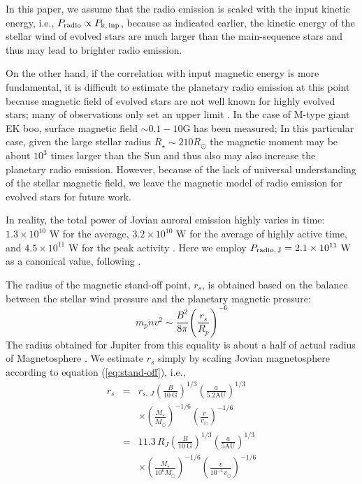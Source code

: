 \documentclass{emulateapj}
\begin{document}
In this paper, we assume that the radio emission is scaled with the input kinetic energy, i.e., $P_{\rm radio} \propto P_{\rm k,\,inp}$, because as indicated earlier, the kinetic energy of the stellar wind of evolved stars are much larger than the main-sequence stars and thus may lead to brighter radio emission. 


On the other hand, if the correlation with input magnetic energy is more fundamental, it is difficult to estimate the planetary radio emission at this point because magnetic field of evolved stars are not well known for highly evolved stars; many of observations only set an upper limit \citep[e.g.,][]{konstantinova2010,petit2013,tsvetkova2013,konstantinova2013,auriere2015}. 
In the case of M-type giant EK boo, surface magnetic field $\sim 0.1-10 $G has been measured; In this particular case, given the large stellar radius $R_\star \sim 210 R_{\odot }$ the magnetic moment may be about $10^3$ times larger than the Sun and thus also may also increase the planetary radio emission. However, because of the lack of universal understanding of the stellar magnetic field, we leave the magnetic model of radio emission for evolved stars for future work. 

In reality, the total power of Jovian auroral emission highly varies in time: $1.3\times 10^{10}$ W for the average, $3.2\times 10^{10}$ W for the average of highly active time, and $4.5 \times 10^{11}$ W for the peak activity \citep{zarka_et_al2004}. Here we employ $P_{\rm radio,\,J}=2.1\times 10^{11}\mbox{~W}$ as a canonical value, following \citet{griesmeier2005,griesmeier2007b}.

The radius of the magnetic stand-off point, $r_s$, is obtained based on the balance between the stellar wind pressure and the planetary magnetic pressure: 
\begin{equation}
m_p n v ^2 \sim \frac{B^2}{8\pi}\left( \frac{r_s}{R_p} \right)^{-6}  \label{eq:stand-off}
\end{equation}
The radius obtained for Jupiter from this equality is about a half of actual radius of Magnetosphere \citep[][]{griesmeier2005}. We estimate $r_s$ simply by scaling Jovian magnetosphere \citep[$r_{s,\,J} \sim 84 R_J$][]{joy2002} according to equation (\ref{eq:stand-off}), i.e., 
\begin{eqnarray}
r_s 
&=& r_{s,\,J} \left( \frac{B}{10~\mbox{G}} \right)^{1/3} \left( \frac{a}{5.2\mbox{AU}} \right)^{1/3}  \\
&& \times \left( \frac{\dot M_\star}{\dot M_\odot} \right)^{-1/6}  \left( \frac{\dot v}{v_{\odot }} \right)^{-1/6} \\
&=& 11.3 \, R_J \left( \frac{B}{10~\mbox{G}} \right)^{1/3}  \left( \frac{a}{5\mbox{AU}} \right)^{1/3} \\
&& \times \left( \frac{\dot M_\star}{10^6 \dot M_\odot} \right)^{-1/6}  \left( \frac{\dot v}{10^{-1}v_{\odot }} \right)^{-1/6}
 \label{eq:stand-off-radius}
\end{eqnarray}
\end{document}
